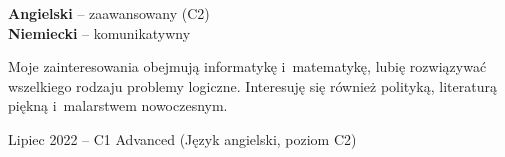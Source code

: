 \documentclass[8pt]{developercv} %
\begin{document}
\begin{minipage}[t]{0.3\textwidth}
  \vspace{-\baselineskip} %


  \textbf{Angielski} -- zaawansowany (C2)\\
  \textbf{Niemiecki} -- komunikatywny
\end{minipage}
\hfill
\begin{minipage}[t]{0.3\textwidth}
  \vspace{-\baselineskip} %


  Moje zainteresowania obejmują informatykę i~matematykę,
  lubię rozwiązywać wszelkiego rodzaju problemy logiczne.
  Interesuję się również polityką, literaturą piękną i~malarstwem nowoczesnym.
\end{minipage}
\hfill
\begin{minipage}[t]{0.35\textwidth}
  \vspace{-\baselineskip} %

  Lipiec 2022 -- C1 Advanced (Język angielski, poziom C2)
\end{minipage}

\end{document}
